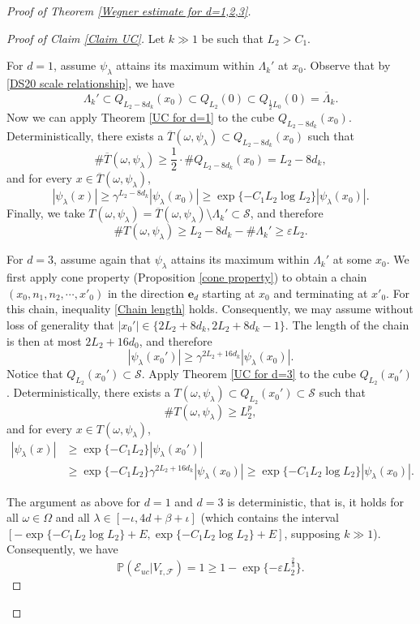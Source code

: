 \documentclass[11pt,reqno,UTF8,twoside]{amsart}
\newcommand{\barLambda}{\overline{\Lambda}}
\newcommand{\bfe}{\mathbf{e}}
\renewcommand{\P}{\mathbb{P}}
\newcommand{\mcE}{\mathcal{E}}
\newcommand{\mcF}{\mathcal{F}}
\newcommand{\mcS}{\mathcal{S}}
\theoremstyle{definition}
\numberwithin{equation}{section}
\begin{document}
\begin{proof}[Proof of Theorem \ref{Wegner estimate for d=1,2,3}]
\begin{proof}[Proof of Claim \ref{Claim UC}]
Let $k\gg1$ be  such that $L_2>C_1$. 

For $d=1$, assume $\psi_{\lambda}$ attains its maximum within $\Lambda_k'$ at $x_0$. Observe that by \eqref{DS20 scale relationship},  we have 
\[\Lambda_k'\subset Q_{L_2 -8d_{k}}(x_0)\subset Q_{L_2}(0)\subset Q_{\frac{1}{2}L_0}(0)=\barLambda_k.\] 
Now we can  apply Theorem \ref{UC for d=1} to the cube $Q_{L_2 -8d_{k}}(x_0)$. Deterministically,  there exists a $\overline{T}(\omega,\psi_{\lambda})\subset Q_{L_2 -8d_{k}}(x_0)$ such that 
\[\# \overline{T}(\omega,\psi_\lambda) \geq \frac{1}{2}\cdot \# Q_{L_2 -8d_{k}}(x_0) =L_2-8d_k,\]
and for every $x\in \overline{T}(\omega,\psi_\lambda)$,
\[|\psi_\lambda(x)|\geq \gamma^{L_2-8d_k}|\psi_{\lambda}(x_0)|\geq  \exp\{-C_1 L_2\log L_2\}|\psi_{\lambda}(x_0)|.\]
Finally, we take $T(\omega,\psi_\lambda)=\overline{T}(\omega,\psi_\lambda)\setminus \Lambda_k'\subset \mcS$, and therefore 
\[\# T (\omega,\psi_\lambda) \geq L_2-8d_k-\# \Lambda_k'\geq \varepsilon L_2 .\]

For $d=3$, assume again that $\psi_{\lambda}$ attains its maximum within $\Lambda_k'$ at some  $x_0$. We first apply cone property (Proposition \ref{cone property}) to obtain a chain $(x_0,n_1,n_2, \cdots, x'_0)$ in the direction $\bfe_d$ starting at $x_0$ and terminating at $x'_0$. For this chain, inequality \eqref{Chain length} holds. Consequently, we may assume without loss of generality that $|x_0'|\in \{2 L_2+8d_k,2 L_2+8d_k-1\}$. The length of the chain is then at most $2L_2+16d_0$, and therefore
\[|\psi_{\lambda}(x_0')|\geq \gamma^{2 L_2+16d_k} |\psi_{\lambda}(x_0)|.\]
Notice that $Q_{L_2}(x_0')\subset \mcS$. Apply Theorem \ref{UC for d=3} to the cube $Q_{L_2}(x_0')$. Deterministically,  there exists a $T(\omega,\psi_{\lambda})\subset Q_{L_2}(x_0')\subset \mcS $ such that 
\[\# T(\omega,\psi_\lambda) \geq L_2^p,\]
and for every $x\in T(\omega,\psi_\lambda)$,
\begin{align*}
  |\psi_\lambda(x)| & \geq \exp\{-C_1  L_2\}  |\psi_{\lambda}(x_0')|\\
    &\geq  \exp\{-C_1 L_2\} \gamma^{2 L_2+16d_k} |\psi_{\lambda}(x_0)|\geq  \exp\{-C_1 L_2\log L_2\}|\psi_{\lambda}(x_0)|.
\end{align*}

The argument as above for $d=1$ and $d=3$ is deterministic, that is, it holds for all $\omega\in\Omega$ and all   $\lambda\in [-\iota,4d+\beta+\iota]$ (which contains the interval $[-\exp\{-C_1L_2\log L_2\}+E, \exp\{-C_1L_2\log L_2 \}+E]$, supposing $k\gg1$). Consequently, we have
\[\P(\mcE_{uc}|V_{\text{r},\mcF })=1 \geq 1-\exp\{-\varepsilon L^{\frac{2}{3}}_2\}.\]


\end{proof}
\end{proof}
\end{document}
